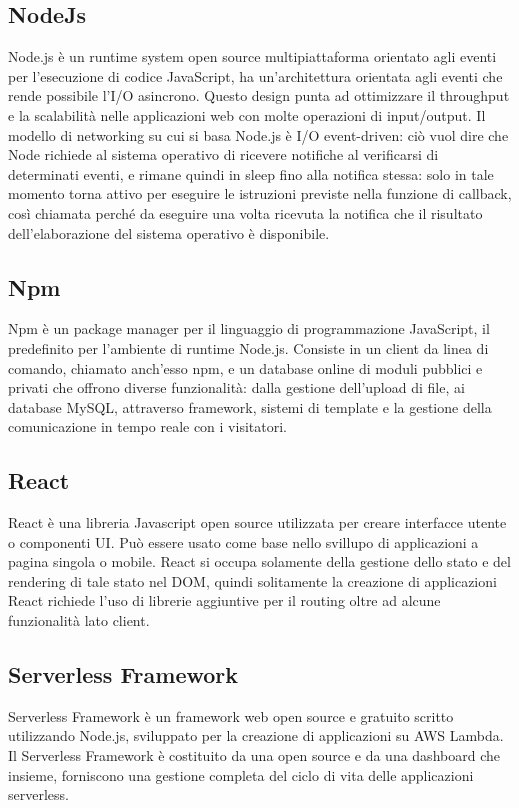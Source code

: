 \subsection{NodeJs}
Node.js è un runtime system open source multipiattaforma orientato agli eventi per l'esecuzione di codice JavaScript, ha un'architettura orientata agli eventi che rende possibile l’I/O asincrono. Questo design punta ad ottimizzare il throughput e la scalabilità nelle applicazioni web con molte operazioni di input/output.
Il modello di networking su cui si basa Node.js è I/O event-driven: ciò vuol dire che Node richiede al sistema operativo di ricevere notifiche al verificarsi di determinati eventi, e rimane quindi in sleep fino alla notifica stessa: solo in tale momento torna attivo per eseguire le istruzioni previste nella funzione di callback, così chiamata perché da eseguire una volta ricevuta la notifica che il risultato dell'elaborazione del sistema operativo è disponibile.

\subsection{Npm}
Npm è un package manager per il linguaggio di programmazione JavaScript, il predefinito per l'ambiente di runtime Node.js. Consiste in un client da linea di comando, chiamato anch'esso npm, e un database online di moduli pubblici e privati che offrono diverse funzionalità: dalla gestione dell’upload di file, ai database MySQL, attraverso framework, sistemi di template e la gestione della comunicazione in tempo reale con i visitatori.

\subsection{React}
React è una libreria Javascript open source utilizzata per creare interfacce utente o componenti UI. Può essere usato come base nello svillupo di applicazioni a pagina singola o mobile.
React si occupa solamente della gestione dello stato e del rendering di tale stato nel DOM, quindi solitamente la creazione di applicazioni React richiede l'uso di librerie aggiuntive per il routing oltre ad alcune funzionalità lato client.

\subsection{Serverless Framework}
Serverless Framework è un framework web open source e gratuito scritto utilizzando Node.js, sviluppato per la creazione di applicazioni su AWS Lambda. Il Serverless Framework è costituito da una  open source e da una dashboard che insieme, forniscono una gestione completa del ciclo di vita delle applicazioni serverless.

